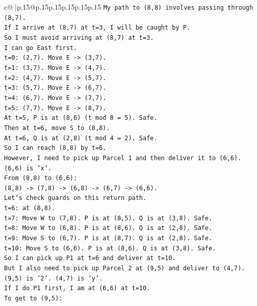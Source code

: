 \documentclass{article}
\begin{document}
{\begin{supertabular}{c@{$\;$}|p{.15\linewidth}@{}p{.15\linewidth}p{.15\linewidth}p{.15\linewidth}p{.15\linewidth}p{.15\linewidth}}
{{{\texttt{My path to (8,8) involves passing through (8,7).} \\
\texttt{If I arrive at (8,7) at t=3, I will be caught by P.} \\
\texttt{So I must avoid arriving at (8,7) at t=3.} \\
\texttt{I can go East first.} \\
\texttt{t=0: (2,7). Move E {-}> (3,7).} \\
\texttt{t=1: (3,7). Move E {-}> (4,7).} \\
\texttt{t=2: (4,7). Move E {-}> (5,7).} \\
\texttt{t=3: (5,7). Move E {-}> (6,7).} \\
\texttt{t=4: (6,7). Move E {-}> (7,7).} \\
\texttt{t=5: (7,7). Move E {-}> (8,7).} \\
\texttt{At t=5, P is at (8,6) (t mod 8 = 5). Safe.} \\
\texttt{Then at t=6, move S to (8,8).} \\
\texttt{At t=6, Q is at (2,8) (t mod 4 = 2). Safe.} \\
\texttt{So I can reach (8,8) by t=6.} \\
\texttt{However, I need to pick up Parcel 1 and then deliver it to (6,6).} \\
\texttt{(6,6) is 'x'.} \\
\texttt{From (8,8) to (6,6):} \\
\texttt{(8,8) {-}> (7,8) {-}> (6,8) {-}> (6,7) {-}> (6,6).} \\
\texttt{Let's check guards on this return path.} \\
\texttt{t=6: at (8,8).} \\
\texttt{t=7: Move W to (7,8). P is at (8,5). Q is at (3,8). Safe.} \\
\texttt{t=8: Move W to (6,8). P is at (8,6). Q is at (2,8). Safe.} \\
\texttt{t=9: Move S to (6,7). P is at (8,7). Q is at (2,8). Safe.} \\
\texttt{t=10: Move S to (6,6). P is at (8,6). Q is at (3,8). Safe.} \\
\texttt{So I can pick up P1 at t=6 and deliver at t=10.} \\
\texttt{But I also need to pick up Parcel 2 at (9,5) and deliver to (4,7).} \\
\texttt{(9,5) is '2'. (4,7) is 'y'.} \\
\texttt{If I do P1 first, I am at (6,6) at t=10.} \\
\texttt{To get to (9,5):} \\
}}}
\end{supertabular}}
\end{document}
